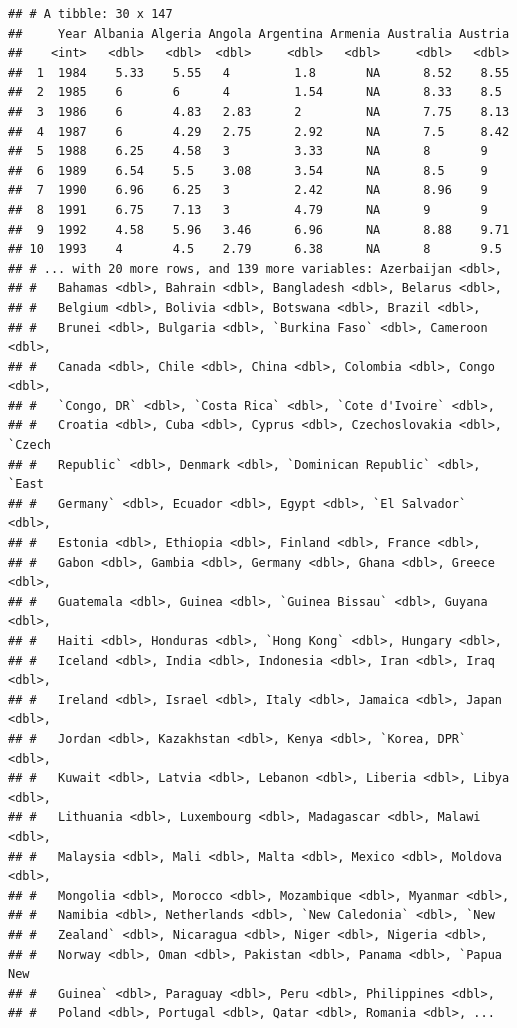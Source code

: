 \documentclass[11pt,]{article}
\begin{document}
\begin{verbatim}
## # A tibble: 30 x 147
##     Year Albania Algeria Angola Argentina Armenia Australia Austria
##    <int>   <dbl>   <dbl>  <dbl>     <dbl>   <dbl>     <dbl>   <dbl>
##  1  1984    5.33    5.55   4         1.8       NA      8.52    8.55
##  2  1985    6       6      4         1.54      NA      8.33    8.5 
##  3  1986    6       4.83   2.83      2         NA      7.75    8.13
##  4  1987    6       4.29   2.75      2.92      NA      7.5     8.42
##  5  1988    6.25    4.58   3         3.33      NA      8       9   
##  6  1989    6.54    5.5    3.08      3.54      NA      8.5     9   
##  7  1990    6.96    6.25   3         2.42      NA      8.96    9   
##  8  1991    6.75    7.13   3         4.79      NA      9       9   
##  9  1992    4.58    5.96   3.46      6.96      NA      8.88    9.71
## 10  1993    4       4.5    2.79      6.38      NA      8       9.5 
## # ... with 20 more rows, and 139 more variables: Azerbaijan <dbl>,
## #   Bahamas <dbl>, Bahrain <dbl>, Bangladesh <dbl>, Belarus <dbl>,
## #   Belgium <dbl>, Bolivia <dbl>, Botswana <dbl>, Brazil <dbl>,
## #   Brunei <dbl>, Bulgaria <dbl>, `Burkina Faso` <dbl>, Cameroon <dbl>,
## #   Canada <dbl>, Chile <dbl>, China <dbl>, Colombia <dbl>, Congo <dbl>,
## #   `Congo, DR` <dbl>, `Costa Rica` <dbl>, `Cote d'Ivoire` <dbl>,
## #   Croatia <dbl>, Cuba <dbl>, Cyprus <dbl>, Czechoslovakia <dbl>, `Czech
## #   Republic` <dbl>, Denmark <dbl>, `Dominican Republic` <dbl>, `East
## #   Germany` <dbl>, Ecuador <dbl>, Egypt <dbl>, `El Salvador` <dbl>,
## #   Estonia <dbl>, Ethiopia <dbl>, Finland <dbl>, France <dbl>,
## #   Gabon <dbl>, Gambia <dbl>, Germany <dbl>, Ghana <dbl>, Greece <dbl>,
## #   Guatemala <dbl>, Guinea <dbl>, `Guinea Bissau` <dbl>, Guyana <dbl>,
## #   Haiti <dbl>, Honduras <dbl>, `Hong Kong` <dbl>, Hungary <dbl>,
## #   Iceland <dbl>, India <dbl>, Indonesia <dbl>, Iran <dbl>, Iraq <dbl>,
## #   Ireland <dbl>, Israel <dbl>, Italy <dbl>, Jamaica <dbl>, Japan <dbl>,
## #   Jordan <dbl>, Kazakhstan <dbl>, Kenya <dbl>, `Korea, DPR` <dbl>,
## #   Kuwait <dbl>, Latvia <dbl>, Lebanon <dbl>, Liberia <dbl>, Libya <dbl>,
## #   Lithuania <dbl>, Luxembourg <dbl>, Madagascar <dbl>, Malawi <dbl>,
## #   Malaysia <dbl>, Mali <dbl>, Malta <dbl>, Mexico <dbl>, Moldova <dbl>,
## #   Mongolia <dbl>, Morocco <dbl>, Mozambique <dbl>, Myanmar <dbl>,
## #   Namibia <dbl>, Netherlands <dbl>, `New Caledonia` <dbl>, `New
## #   Zealand` <dbl>, Nicaragua <dbl>, Niger <dbl>, Nigeria <dbl>,
## #   Norway <dbl>, Oman <dbl>, Pakistan <dbl>, Panama <dbl>, `Papua New
## #   Guinea` <dbl>, Paraguay <dbl>, Peru <dbl>, Philippines <dbl>,
## #   Poland <dbl>, Portugal <dbl>, Qatar <dbl>, Romania <dbl>, ...
\end{verbatim}
\end{document}
